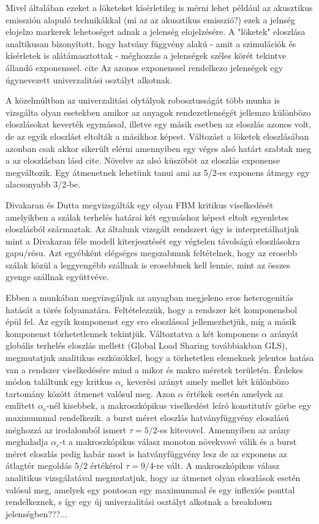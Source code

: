 Mivel általában ezeket a löketeket kísérletileg is mérni lehet például az akusztikus emisszión alapuló technikákkal (mi az az 
akusztikus emisszió?) ezek a jelnség elojelzo markerek lehetoséget adnak a jelenség elojelzésére. A "löketek" eloszlása
analtikusan bizonyított, hogy hatvány függvény alakú - amit a szimulációk és kísérletek is alátámasztottak - méghozzás
a jelenségek széles körét tekintve állandó exponenssel. cite Az azonos exponenssel rendelkezo jelenségek egy úgynevezett 
univerzalitási osztályt alkotnak. 

A közelmúltban az univerzalitási olytályok robosztusságát több munka is vizsgálta olyan esetekben amikor az anyagok rendezetlenségét
jellemzo különbözo eloszlásokat keverték egymással, illetve egy másik esetben az eloszlás azonos volt, de az egyik eloszlást eltolták 
a másikhoz képest. Változást a löketek eloszlásában azonban csak akkor sikerült elérni amennyiben egy véges alsó határt szabtak meg a 
az eloszlásban lásd cite. Növelve az alsó küszöböt az eloszlás exponense megváltozik. Egy átmenetnek lehetünk tanui ami az 5/2-es 
exponens átmegy egy alacsonyabb 3/2-be.

Divakaran és Dutta megvizsgálták egy olyan FBM kritikus viselkedését amelyikben a szálak terhelés határai két egymáshoz képest eltolt
egyenletes eloszlásból származtak. Az általunk vizsgált rendszert úgy is interpretálhatjuk mint a Divakaran féle modell kiterjesztését
egy végtelen távolságú eloszlásokra gapu/résu. Azt egyébként elégséges megszabnunk feltételnek, hogy az erosebb szálak közül a leggyengébb
szállnak is erosebbnek kell lennie, mint az összes gyenge szállnak együttvéve.

Ebben a munkában megvizsgáljuk az anyagban megjeleno eros heterogenitás hatását a törés folyamatára. Feltételezzük, hogy a rendszer 
két komponensbol épül fel. Az egyik komponenst egy ero eloszlással jellemezhetjük, míg a másik komponenst törhetetlennek tekintjük.
Változtatva a két komponens $\alpha$ arányát globális terhelés eloszlás mellett (Global Load Sharing továbbiakban GLS), megmutatjuk analitikus
eszközökkel, hogy a törhetetlen elemeknek jelentos hatása van a rendszer viselkedésére mind a mikor és makro méretek területén.
Érdekes módon találtunk egy kritkus $\alpha_c$ keverési arányt amely mellet két különbözo tartomány között átmenet valósul meg. Azon
 $\alpha$ értékek esetén amelyek az említett $\alpha_c$-nél kisebbek, a makroszkópikus viselkedést leíró konstitutív görbe egy
 maximummal rendelkezik. a burst méret eloszlás hatványfüggvény eloszlású méghozzá az irodalomból ismert $\tau=5/2$-es  kitevovel.
Amennyiben az arány meghaladja $\alpha_c$-t a makroszkópikus válasz monoton növekvové válik és a burst méret eloszlás pedig
habár most is hatványfüggvény lesz de az exponens az átlagtér megoldás $5/2$ értékérol $\tau=9/4$-re vált. A makroszkópikus válasz
analitikus vizsgálatával megmutatjuk, hogy az átmenet olyan eloszlások esetén valósul meg, amelyek egy pontosan egy maximummal
 és egy inflexiós ponttal rendelkeznek, s így egy új univerzalitási osztályt alkotnak a breakdown jelenségben???...
 
